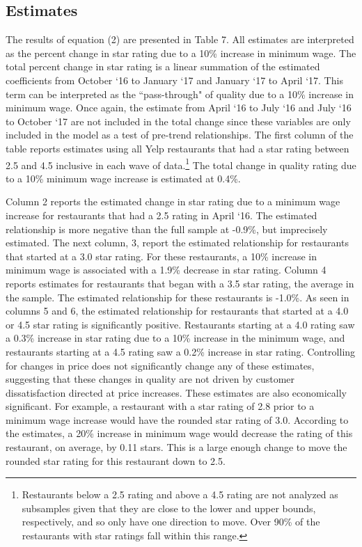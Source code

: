 \documentclass[11pt]{article}
\begin{document}
\subsection{Estimates}
The results of equation (2) are presented in Table 7. All estimates are interpreted as the percent change in star rating due to a 10\% increase in minimum wage. The total percent change in star rating is a linear summation of the estimated coefficients from October `16 to January `17 and January `17 to April `17. This term can be interpreted as the ``pass-through" of quality due to a 10\% increase in minimum wage. Once again, the estimate from April `16 to July `16 and July `16 to October `17 are not included in the total change since these variables are only included in the model as a test of pre-trend relationships. The first column of the table reports estimates using all Yelp restaurants that had a star rating between 2.5 and 4.5 inclusive in each wave of data.\footnote{Restaurants below a 2.5 rating and above a 4.5 rating are not analyzed as subsamples given that they are close to the lower and upper bounds, respectively, and so only have one direction to move. Over 90\% of the restaurants with star ratings fall within this range.} The total change in quality rating due to a 10\% minimum wage increase is estimated at 0.4\%. 

Column 2 reports the estimated change in star rating due to a minimum wage increase for restaurants that had a 2.5 rating in April `16. The estimated relationship is more negative than the full sample at -0.9\%, but imprecisely estimated. The next column, 3, report the estimated relationship for restaurants that started at a 3.0 star rating. For these restaurants, a 10\% increase in minimum wage is associated with a 1.9\% decrease in star rating. Column 4 reports estimates for restaurants that began with a 3.5 star rating, the average in the sample. The estimated relationship for these restaurants is -1.0\%. As seen in columns 5 and 6, the estimated relationship for restaurants that started at a 4.0 or 4.5 star rating is significantly positive. Restaurants starting at a 4.0 rating saw a 0.3\% increase in star rating due to a 10\% increase in the minimum wage, and restaurants starting at a 4.5 rating saw a 0.2\% increase in star rating. Controlling for changes in price does not significantly change any of these estimates, suggesting that these changes in quality are not driven by customer dissatisfaction directed at price increases. These estimates are also economically significant. For example, a restaurant with a star rating of 2.8 prior to a minimum wage increase would have the rounded star rating of 3.0. According to the estimates, a 20\% increase in minimum wage would decrease the rating of this restaurant, on average, by 0.11 stars. This is a large enough change to move the rounded star rating for this restaurant down to 2.5. 
\end{document}

